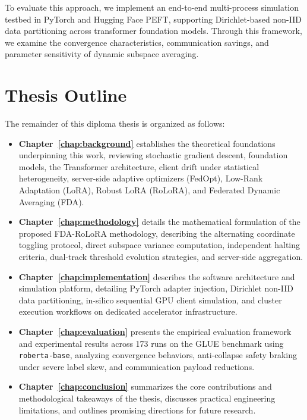 To evaluate this approach, we implement an end-to-end multi-process simulation testbed in PyTorch and Hugging Face PEFT, supporting Dirichlet-based non-IID data partitioning across transformer foundation models. Through this framework, we examine the convergence characteristics, communication savings, and parameter sensitivity of dynamic subspace averaging.

\section{Thesis Outline}
\label{sec:intro-outline}
The remainder of this diploma thesis is organized as follows:

\begin{itemize}
    \item \textbf{Chapter~\ref{chap:background}} establishes the theoretical foundations underpinning this work, reviewing stochastic gradient descent, foundation models, the Transformer architecture, client drift under statistical heterogeneity, server-side adaptive optimizers (FedOpt), Low-Rank Adaptation (LoRA), Robust LoRA (RoLoRA), and Federated Dynamic Averaging (FDA).
    \item \textbf{Chapter~\ref{chap:methodology}} details the mathematical formulation of the proposed FDA-RoLoRA methodology, describing the alternating coordinate toggling protocol, direct subspace variance computation, independent halting criteria, dual-track threshold evolution strategies, and server-side aggregation.
    \item \textbf{Chapter~\ref{chap:implementation}} describes the software architecture and simulation platform, detailing PyTorch adapter injection, Dirichlet non-IID data partitioning, in-silico sequential GPU client simulation, and cluster execution workflows on dedicated accelerator infrastructure.
    \item \textbf{Chapter~\ref{chap:evaluation}} presents the empirical evaluation framework and experimental results across 173 runs on the GLUE benchmark using \texttt{roberta-base}, analyzing convergence behaviors, anti-collapse safety braking under severe label skew, and communication payload reductions.
    \item \textbf{Chapter~\ref{chap:conclusion}} summarizes the core contributions and methodological takeaways of the thesis, discusses practical engineering limitations, and outlines promising directions for future research.
\end{itemize}
